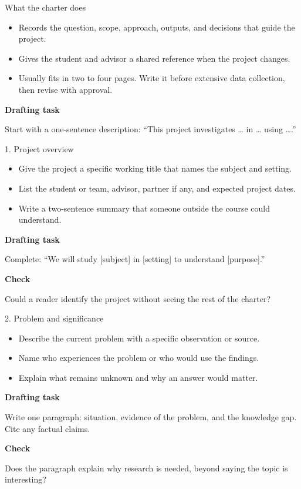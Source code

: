 \documentclass[aspectratio=43,11pt]{beamer}
\newcommand{\draft}[1]{\medskip\textbf{Drafting task}\par #1}
\newcommand{\checkit}[1]{\medskip\textbf{Check}\par #1}
\begin{document}
\begin{frame}{What the charter does}
  \begin{itemize}
    \item Records the question, scope, approach, outputs, and decisions that guide the project.
    \item Gives the student and advisor a shared reference when the project changes.
    \item Usually fits in two to four pages. Write it before extensive data collection, then revise with approval.
  \end{itemize}
  
  \draft{Start with a one-sentence description: ``This project investigates \ldots{} in \ldots{} using \ldots{}.''}
\end{frame}

\begin{frame}{1. Project overview}
  \begin{itemize}
    \item Give the project a specific working title that names the subject and setting.
    \item List the student or team, advisor, partner if any, and expected project dates.
    \item Write a two-sentence summary that someone outside the course could understand.
  \end{itemize}
  
  \draft{Complete: ``We will study [subject] in [setting] to understand [purpose].''}
  
  \checkit{Could a reader identify the project without seeing the rest of the charter?}
\end{frame}

\begin{frame}{2. Problem and significance}
  \begin{itemize}
    \item Describe the current problem with a specific observation or source.
    \item Name who experiences the problem or who would use the findings.
    \item Explain what remains unknown and why an answer would matter.
  \end{itemize}
  
  \draft{Write one paragraph: situation, evidence of the problem, and the knowledge gap. Cite any factual claims.}
  
  \checkit{Does the paragraph explain why research is needed, beyond saying the topic is interesting?}
\end{frame}
\end{document}
